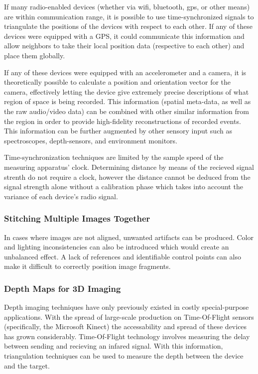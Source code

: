 \documentclass[a4paper,12pt]{report}
\begin{document}
If many radio-enabled devices (whether via wifi, bluetooth, gps, or other means) are within communication range, it is possible to use time-synchronized signals to triangulate the positions of the devices with respect to each other. If any of these devices were equipped with a GPS, it could communicate this information and allow neighbors to take their local position data (respective to each other) and place them globally.

If any of these devices were equipped with an accelerometer and a camera, it is theoretically possible to calculate a position and orientation vector for the camera, effectively letting the device give extremely precise descriptions of what region of space is being recorded. This information (spatial meta-data, as well as the raw audio/video data) can be combined with other similar information from the region in order to provide high-fidelity reconstructions of recorded events. This information can be further augmented by other sensory input such as spectroscopes, depth-sensors, and environment monitors.

Time-synchronization techniques are limited by the sample speed of the measuring apparatus' clock. Determining distance by means of the recieved signal strenth do not require a clock, however the distance cannot be deduced from the signal strength alone without a calibration phase which takes into account the variance of each device's radio signal.

\subsubsection{Stitching Multiple Images Together}
In cases where images are not aligned, unwanted artifacts can be produced. Color and lighting inconsistencies can also be introduced which would create an unbalanced effect. A lack of references and identifiable control points can also make it difficult to correctly position image fragments. \cite{4359344,5397590}

\subsubsection{Depth Maps for 3D Imaging}
Depth imaging techniques have only previously existed in costly special-purpose applications. With the spread of large-scale production on Time-Of-Flight sensors (specifically, the Microsoft Kinect) the accessability and spread of these devices has grown considerably. Time-Of-Flight technology involves measuring the delay between sending and recieving an infared signal. With this information, triangulation techniques can be used to measure the depth between the device and the target. 
\end{document}
